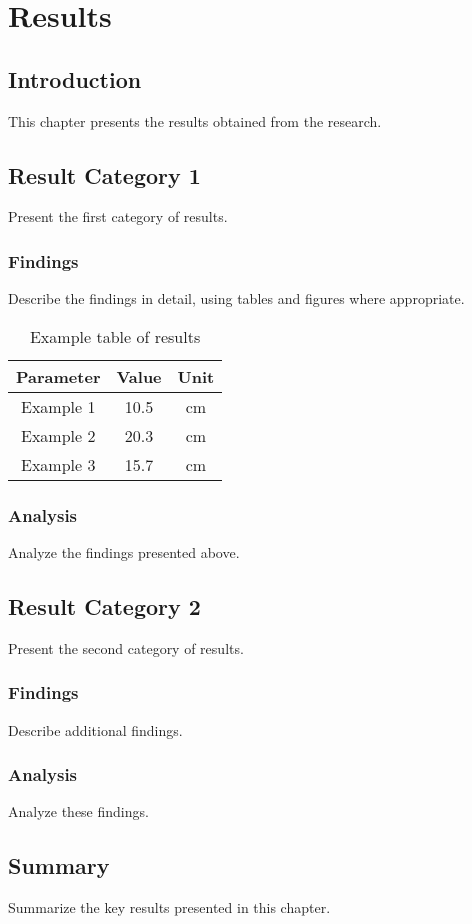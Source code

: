 \chapter{Results}
\label{ch:results}

\section{Introduction}
This chapter presents the results obtained from the research.

\section{Result Category 1}
Present the first category of results.

\subsection{Findings}
Describe the findings in detail, using tables and figures where appropriate.

\begin{table}[ht]
    \centering
    \begin{tabular}{|c|c|c|}
        \hline
        \textbf{Parameter} & \textbf{Value} & \textbf{Unit} \\
        \hline
        Example 1 & 10.5 & cm \\
        Example 2 & 20.3 & cm \\
        Example 3 & 15.7 & cm \\
        \hline
    \end{tabular}
    \caption{Example table of results}
    \label{tab:example-results}
\end{table}

\subsection{Analysis}
Analyze the findings presented above.

\section{Result Category 2}
Present the second category of results.

\subsection{Findings}
Describe additional findings.

\subsection{Analysis}
Analyze these findings.

\section{Summary}
Summarize the key results presented in this chapter.
